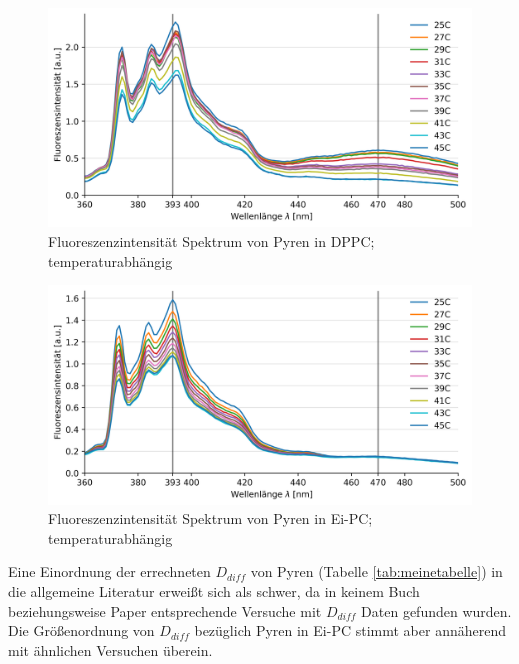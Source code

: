 \begin{figure}[h!]
	\begin{center}
		\begin{minipage}{0,8\textwidth}
			
			\includegraphics[width=\textwidth]{picture/Temp_Geraet4.png}
			\caption{Fluoreszenzintensität Spektrum von Pyren in DPPC; temperaturabhängig} 
			\label{Temp_Geraet4} 
		\end{minipage}
	\end{center}
\end{figure}
\begin{figure}[h!]
	\begin{center}
		\begin{minipage}{0,8\textwidth}
			
			\includegraphics[width=\textwidth]{picture/Temp.png}
			\caption{Fluoreszenzintensität Spektrum von Pyren in Ei-PC; temperaturabhängig} 
			\label{Temp} 
		\end{minipage}
	\end{center}
\end{figure}
Eine Einordnung der errechneten $D_{diff}$ von Pyren (Tabelle \ref{tab:meinetabelle}) in die allgemeine Literatur erweißt sich als schwer, da in keinem Buch beziehungsweise Paper entsprechende Versuche mit $D_{diff}$ Daten gefunden wurden. Die Größenordnung von $D_{diff}$ bezüglich Pyren in Ei-PC stimmt aber annäherend mit ähnlichen Versuchen überein. \cite{Wu1977} \\\\
